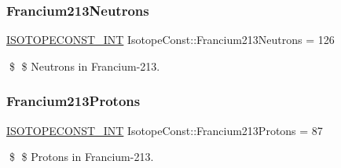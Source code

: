 \subsubsection{\texorpdfstring{Francium213\+Neutrons}{Francium213Neutrons}}
{\footnotesize\ttfamily \mbox{\hyperlink{group___isotope_const-_macros_ga5f18360b3e99483a35c32d789e62621c}{I\+S\+O\+T\+O\+P\+E\+C\+O\+N\+S\+T\+\_\+\+I\+NT}} Isotope\+Const\+::\+Francium213\+Neutrons = 126}

\$ \$ Neutrons in Francium-\/213. \mbox{\label{group___isotope_const-_francium-_fr213_ga215957680295e01a3225be80ec2c66aa}} 
\subsubsection{\texorpdfstring{Francium213\+Protons}{Francium213Protons}}
{\footnotesize\ttfamily \mbox{\hyperlink{group___isotope_const-_macros_ga5f18360b3e99483a35c32d789e62621c}{I\+S\+O\+T\+O\+P\+E\+C\+O\+N\+S\+T\+\_\+\+I\+NT}} Isotope\+Const\+::\+Francium213\+Protons = 87}

\$ \$ Protons in Francium-\/213. 